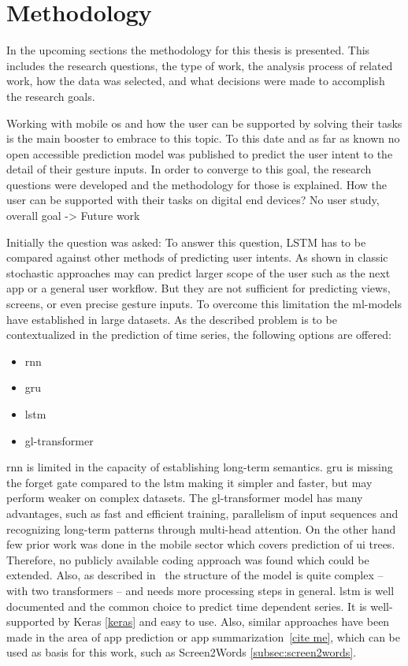 \chapter{Methodology}

In the upcoming sections the methodology for this thesis is presented.
This includes the research questions, the type of work, the analysis process of related work, how the data was selected, and what decisions were made to accomplish the research goals.

Working with mobile \gls{os} and how the user can be supported by solving their tasks is the main booster to embrace to this topic.
To this date and as far as known no open accessible prediction model was published to predict the user intent to the detail of their gesture inputs.
In order to converge to this goal, the research questions were developed and the methodology for those is explained.
How the user can be supported with their tasks on digital end devices?
No user study, overall goal -> Future work

Initially the question was asked: 
To answer this question, LSTM has to be compared against other methods of predicting user intents.
As shown in  classic stochastic approaches may can predict larger scope of the user such as the next app or a general user workflow.
But they are not sufficient for predicting views, screens, or even precise gesture inputs.
To overcome this limitation the \gls{ml}-models have established in large datasets.
As the described problem is to be contextualized in the prediction of time series, the following options are offered:
\begin{itemize}
    \item \gls{rnn}
    \item \gls{gru}
    \item \gls{lstm}
    \item \gls{gl-transformer}
\end{itemize}

\gls{rnn} is limited in the capacity of establishing long-term semantics.
\gls{gru} is missing the forget gate compared to the \gls{lstm} making it simpler and faster, but may perform weaker on complex datasets.
The \gls{gl-transformer} model has many advantages, such as fast and efficient training, parallelism of input sequences and recognizing long-term patterns through multi-head attention.
On the other hand few prior work was done in the mobile sector which covers prediction of \gls{ui} trees.
Therefore, no publicly available coding approach was found which could be extended.
Also, as described in~\cite{zhou2021large} the structure of the model is quite complex -- with two transformers -- and needs more processing steps in general.
\gls{lstm} is well documented and the common choice to predict time dependent series.
It is well-supported by Keras \ref{keras} and easy to use.
Also, similar approaches have been made in the area of app prediction or app summarization~\ref{cite me}, which can be used as basis for this work, such as Screen2Words \ref{subsec:screen2words}.

